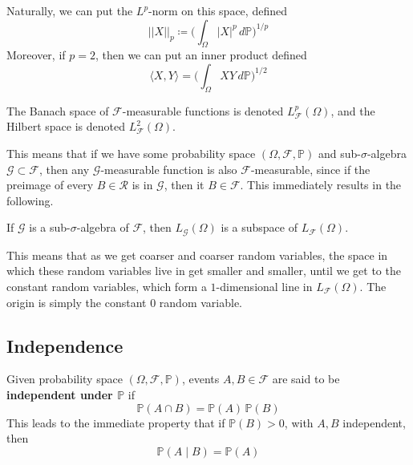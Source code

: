     Naturally, we can put the $L^p$-norm on this space, defined 
    \begin{equation}
      ||X||_p \coloneqq \bigg( \int_\Omega |X|^p \, d\mathbb{P} \bigg)^{1/p}
    \end{equation}
    Moreover, if $p = 2$, then we can put an inner product defined 
    \begin{equation}
      \langle X, Y \rangle = \bigg( \int_\Omega X Y \,d \mathbb{P} \bigg)^{1/2}
    \end{equation}

    \begin{definition}
      The Banach space of $\mathcal{F}$-measurable functions is denoted $L_\mathcal{F}^p (\Omega)$, and the Hilbert space is denoted $L_\mathcal{F}^2 (\Omega)$. 
    \end{definition}

    This means that if we have some probability space $(\Omega, \mathcal{F}, \mathbb{P})$ and  sub-$\sigma$-algebra $\mathcal{G} \subset \mathcal{F}$, then any $\mathcal{G}$-measurable function is also $\mathcal{F}$-measurable, since if the preimage of every $B \in \mathcal{R}$ is in $\mathcal{G}$, then it $B \in \mathcal{F}$. This immediately results in the following. 

    \begin{theorem}
      If $\mathcal{G}$ is a sub-$\sigma$-algebra of $\mathcal{F}$, then $L_\mathcal{G} (\Omega)$ is a subspace of $L_\mathcal{F} (\Omega)$. 
    \end{theorem}

    This means that as we get coarser and coarser random variables, the space in which these random variables live in get smaller and smaller, until we get to the constant random variables, which form a $1$-dimensional line in $L_\mathcal{F} (\Omega)$. The origin is simply the constant $0$ random variable. 

\subsection{Independence}

  \begin{definition}
    Given probability space $(\Omega, \mathcal{F}, \mathbb{\mathbb{P}})$, events $A, B \in \mathcal{F}$ are said to be \textbf{independent under $\mathbf{\mathbb{P}}$} if 
    \begin{equation}
      \mathbb{P}(A \cap B) = \mathbb{P}(A) \, \mathbb{P}(B)
    \end{equation}
    This leads to the immediate property that if $\mathbb{P}(B) > 0$, with $A, B$ independent, then 
    \begin{equation}
      \mathbb{P}(A \mid B) = \mathbb{P}(A)
    \end{equation}
  \end{definition}

